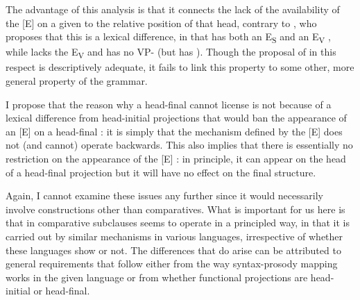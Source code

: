 The advantage of this analysis is that it connects the lack of the availability of the [E]  on a given  to the relative position of that head, contrary to \citet{merchant2013}, who proposes that this is a lexical difference, in that  has both an E\textsubscript{S} and an E\textsubscript{V} , while  lacks the E\textsubscript{V}  and has no VP- (but has ). Though the proposal of \citet{merchant2013} in this respect is descriptively adequate, it fails to link this property to some other, more general property of the grammar.

I propose that the reason why a head-final  cannot license  is not because of a lexical difference from head-initial projections that would ban the appearance of an [E]  on a head-final : it is simply that the  mechanism defined by the [E]  does not (and cannot) operate backwards. This also implies that there is essentially no restriction on the appearance of the [E] : in principle, it can appear on the head of a head-final projection but it will have no effect on the final structure.

Again, I cannot examine these issues any further since it would necessarily involve constructions other than comparatives. What is important for us here is that  in comparative subclauses seems to operate in a principled way, in that it is carried out by similar mechanisms in various languages, irrespective of whether these languages show  or not. The differences that do arise can be attributed to general requirements that follow either from the way syntax-prosody mapping works in the given language or from whether functional projections are head-initial or head-final.

